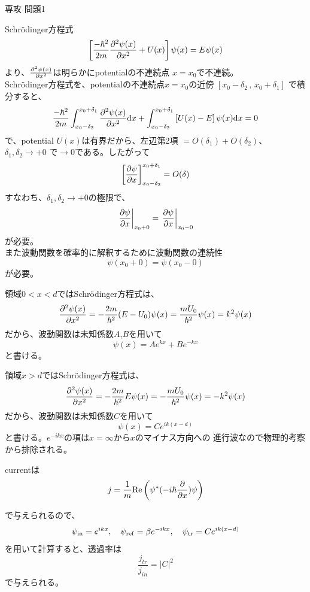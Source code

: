 \documentclass[fleqn]{jbook}
\begin{document}
\begin{answer}{専攻 問題1}{}

\begin{subanswers}
\SubAnswer
  \begin{subsubanswers}
  \SubSubAnswer
    Schr\"{o}dinger方程式
%
    \[ \left[\frac{-\hbar ^2}{2m}{\frac{\partial ^2\psi (x)}{\partial x^2}}+U(x)\right]
       \psi (x)=E\psi (x)\]
%
    より、${\frac{\partial ^2\psi (x)}{\partial x^2}}$は明らかにpotentialの不連続点
    $x=x_0$で不連続。\\
    Schr\"{o}dinger方程式を、potentialの不連続点$x=x_0$の近傍
    $\left[ {x_0-\delta_2 \,,\, x_0+\delta_1 } \right]$
    で積分すると、
%
    \[ \frac{-\hbar ^2}{2m}\int_{x_0-\delta_2}^{x_0+\delta_1} 
       {\frac{\partial ^2\psi (x)}{\partial x^2}}{\rm d}x
      +\int_{x_0-\delta_2}^{x_0+\delta_1} {\left[ {U(x)-E} \right]\psi (x){\rm d}x}=0 \]
%
    で、potential $U(x)$は有界だから、左辺第2項
    $=O(\delta_1)+O(\delta_2)$、$\delta_1,\delta_2 \rightarrow +0$
    で$\rightarrow 0$である。したがって
%
    \[\left[ {\frac{\partial \psi}{\partial x}} \right]_{x_0-\delta_2 }^{x_0+\delta_1 }=O(\delta)\]
%
    すなわち、$\delta_1,\delta_2 \rightarrow +0$の極限で、
%
    \[ \left. {\frac{\partial \psi }{\partial x}}\right|_{x_0+0 }=
       \left. {\frac{\partial \psi }{\partial x}} \right|_{x_0-0 }\]
%
    が必要。\\
    また波動関数を確率的に解釈するために波動関数の連続性
%
    \[\psi (x_0+0 )=\psi (x_0-0 )\]
%
    が必要。

  \SubSubAnswer
    領域$0<x<d$ではSchr\"{o}dinger方程式は、
%
    \[ \Partial{^2\psi (x)}{x^2}%
         = -\frac{2m}{\hbar ^2}(E-U_0)\psi (x)%
         =  \frac{mU_0}{\hbar ^2}\psi (x)=k^2\psi (x) \]
%
    だから、波動関数は未知係数$A$,$B$を用いて
%
    \[ \psi (x)=Ae^{kx}+Be^{-kx} \]
%
    と書ける。

    領域$x>d$ではSchr\"{o}dinger方程式は、
%
    \[ {\frac{\partial ^2\psi (x)}{\partial x^2}}=-{\frac{2m}{\hbar ^2}}E\psi (x)
       = -{\frac{mU_0}{\hbar ^2}}\psi (x)=-k^2\psi (x)\]
%
    だから、波動関数は未知係数$C$を用いて
%
    \[ \psi (x)=Ce^{ik(x-d)}\]
%
    と書ける。$e^{-ikx}$の項は$x=\infty $から$x$のマイナス方向への
    進行波なので物理的考察から排除される。

  \SubSubAnswer
    currentは
%
    \[ j = \frac{1}{m}{\rm Re} \left(%
            {\psi ^*(-i\hbar \Partial{}{x})\psi } \right)\]
%

    で与えられるので、
%
    \[ \psi _{\rm in}=e^{ikx}, \quad%
       \psi _{\rm ref}=\beta e^{-ikx}, \quad%
       \psi _{\rm tr}=Ce^{ik(x-d)} \]
%
    を用いて計算すると、透過率は
%
    \[ \frac{j_{tr}}{j_{in}}=\left| C \right|^2 \]
%
    で与えられる。


\end{subsubanswers}
\end{subanswers}
\end{answer}
\end{document}
